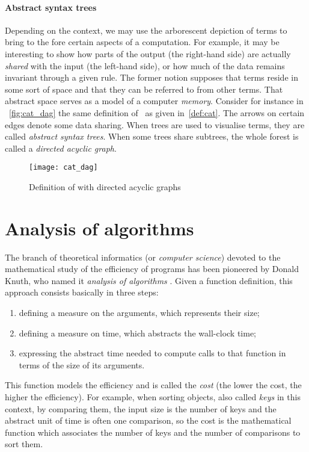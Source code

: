 \paragraph{Abstract syntax trees}

Depending on the context, we may use the arborescent depiction of
terms to bring to the fore certain aspects of a computation. For
example, it may be interesting to show how parts of the output (the
right\hyp{}hand side) are actually \emph{shared} with
the input (the left\hyp{}hand side), or how much of the data remains
invariant through a given rule. The former notion supposes that terms
reside in some sort of space and that they can be referred to from
other terms. That abstract space serves as a model of a computer
\emph{memory}. Consider for instance in
\fig~\vref{fig:cat_dag} the same definition of~ as given
in~\eqref{def:cat}. The arrows on certain edges denote some data
sharing. When trees are used to visualise terms, they are called
\emph{abstract syntax trees}. When
some trees share subtrees, the whole forest is called a \emph{directed
acyclic graph}. 
\begin{figure}[H]
\centering
\texttt{[image: cat\_dag]}
\caption{Definition of  with directed acyclic graphs
\label{fig:cat_dag}}
\end{figure}

\section{Analysis of algorithms}

The branch of theoretical informatics (or \emph{computer science})
devoted to the mathematical study of the efficiency of programs has
been pioneered by Donald Knuth, who named it \emph{analysis of
  algorithms} \citep{SedgewickFlajolet_1996,Knuth_1997}. Given a
function definition, this approach consists basically in three steps:
\begin{enumerate}

  \item defining a measure on the arguments, which represents their
    size;

  \item defining a measure on time, which abstracts the
    wall\hyp{}clock time;

  \item expressing the abstract time needed to compute calls to that
    function in terms of the size of its arguments.

\end{enumerate}
This function models the efficiency and is called the
\emph{cost} (the lower the cost, the higher the
efficiency). For example, when sorting objects, also called
\emph{keys} in this context, by comparing
them, the input size is the number of keys and the abstract unit of
time is often one comparison, so the cost is the mathematical function
which associates the number of keys and the number of comparisons to
sort them.


